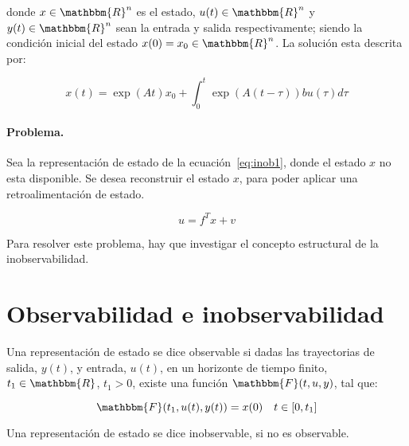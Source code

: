 	donde $x \in \mathbbm{R}^n$ es el estado, $u(t) \in \mathbbm{R}^n$ y $y(t) \in \mathbbm{R}^n$ sean la entrada y salida respectivamente; siendo la condición inicial del estado $x(0) = x_0 \in \mathbbm{R}^n$. La solución esta descrita por:

	\begin{equation*}
		x(t) = \exp{(At)} x_0 + \int_0^t \exp{\left(A(t - \tau)\right)} b u(\tau) d\tau
	\end{equation*}

	\paragraph{Problema.}

	Sea la representación de estado de la ecuación~\ref{eq:inob1}, donde el estado $x$ no esta disponible. Se desea reconstruir el estado $x$, para poder aplicar una retroalimentación de estado.

	\begin{equation}
		u = f^T x + v
	\end{equation}

	Para resolver este problema, hay que investigar el concepto estructural de la inobservabilidad.


	\newpage
    \section{Observabilidad e inobservabilidad}

	    Una representación de estado se dice observable si dadas las trayectorias de salida, $y(t)$, y entrada, $u(t)$, en un horizonte de tiempo finito, $t_1 \in \mathbbm{R}$, $t_1 > 0$, existe una función $\mathbbm{F}(t, u, y)$, tal que:

	    \begin{equation}
	    	\mathbbm{F}(t_1, u(t), y(t)) = x(0) \quad t \in [0, t_1]
	    \end{equation}




	    Una representación de estado se dice inobservable, si no es observable.

